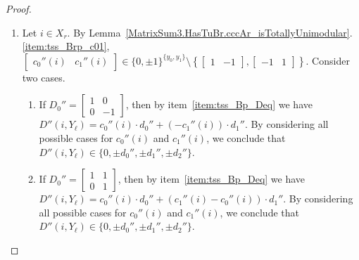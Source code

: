 \begin{proof}
\begin{enumerate}
        \item Let $i \in X_{r}$. By Lemma~\ref{MatrixSum3.HasTuBr.cccAr_isTotallyUnimodular}.\ref{item:tss_Brp_c01}, $\begin{bmatrix} c_{0}'' (i) & c_{1}'' (i) \end{bmatrix} \in \{0, \pm 1\}^{\{y_{0}, y_{1}\}} \setminus \left\{ \begin{bmatrix} 1 & -1 \end{bmatrix}, \begin{bmatrix} -1 & 1 \end{bmatrix} \right\}$. Consider two cases.
        \begin{enumerate}
            \item If $D_{0}'' = \begin{bmatrix} 1 & 0 \\ 0 & -1 \end{bmatrix}$, then by item~\ref{item:tss_Bp_Deq} we have $D'' (i, Y_{\ell}) = c_{0}'' (i) \cdot d_{0}''  + (-c_{1}'' (i)) \cdot d_{1}''$. By considering all possible cases for $c_{0}'' (i)$ and $c_{1}'' (i)$, we conclude that $D'' (i, Y_{\ell}) \in \{0, \pm d_{0}'', \pm d_{1}'', \pm d_{2}''\}$.
            \item If $D_{0}'' = \begin{bmatrix} 1 & 1 \\ 0 & 1 \end{bmatrix}$, then by item~\ref{item:tss_Bp_Deq} we have $D'' (i, Y_{\ell}) = c_{0}'' (i) \cdot d_{0}'' + (c_{1}'' (i) - c_{0}'' (i)) \cdot d_{1}''$. By considering all possible cases for $c_{0}'' (i)$ and $c_{1}'' (i)$, we conclude that $D'' (i, Y_{\ell}) \in \{0, \pm d_{0}'', \pm d_{1}'', \pm d_{2}''\}$.
        \end{enumerate}



\end{enumerate}
\end{proof}
